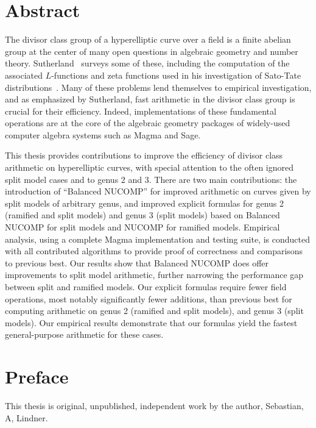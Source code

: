 
\chapter{Abstract}
The divisor class group of a hyperelliptic curve over a field is a finite
abelian group at the center of many open questions in algebraic
geometry and number theory. Sutherland~\cite{Sutherland_g3_2019} surveys some of
these, including the computation of the associated $L$-functions and zeta
functions used in his investigation of Sato-Tate
distributions~\cite{Sutherland_sato_2016}. Many of these problems lend
themselves to empirical investigation, and as emphasized by Sutherland, fast
arithmetic in the divisor class group is crucial for their efficiency. Indeed,
implementations of these fundamental operations are at the core of the algebraic
geometry packages of widely-used computer algebra systems such as Magma and
Sage. 

This thesis provides contributions to improve the efficiency of divisor class
arithmetic on hyperelliptic curves, with special attention to the often ignored
split model cases and to genus 2 and 3. There are two main contributions: the
introduction of ``Balanced NUCOMP'' for improved arithmetic on curves given by
split models of arbitrary genus, and improved explicit formulas for genus 2
(ramified and split models) and genus 3 (split models) based on Balanced NUCOMP
for split models and NUCOMP for ramified models. Empirical analysis, using a
complete Magma implementation and testing suite, is conducted with all
contributed algorithms to provide proof of correctness and comparisons to
previous best. Our results show that Balanced NUCOMP does offer improvements to
split model arithmetic, further narrowing the performance gap between split and
ramified models. Our explicit formulas require fewer field operations, most
notably significantly fewer additions, than previous best for computing
arithmetic on genus 2 (ramified and split models), and genus 3 (split models).
Our empirical results demonstrate that our formulas yield the fastest
general-purpose arithmetic for these cases.

\chapter{Preface}

This thesis is original, unpublished, independent work by the author,
Sebastian, A, Lindner.


